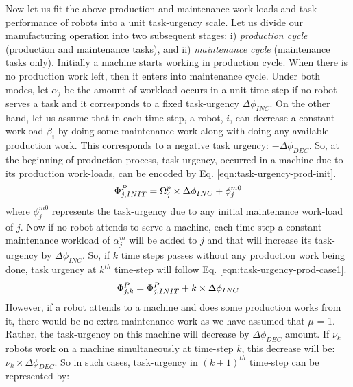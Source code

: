 \documentclass[journal]{IEEEtran}
\begin{document}
Now let us fit the above production and maintenance work-loads and task performance of robots into a unit task-urgency scale. Let us divide our manufacturing operation into two subsequent stages: i) \textit{production cycle} (production and maintenance tasks), and ii) \textit{maintenance cycle} (maintenance tasks only). Initially a machine starts working in production cycle. When there is no production work left, then it enters into maintenance cycle. Under both modes, let $\alpha_{j}$ be the amount of workload occurs in a unit time-step if no robot serves a task and it corresponds to a fixed task-urgency $\Delta \phi_{INC}$. On the other hand, let us assume that in each time-step, a robot, $i$, can decrease a constant workload $\beta_{i}$ by doing some maintenance work along with doing any available production work. This corresponds to a negative task urgency: $- \Delta \phi_{DEC}$. So, at the beginning of production process, task-urgency, occurred in a machine due to its production work-loads, can be encoded by Eq. \ref{eqn:task-urgency-prod-init}.
\begin{equation}
\begin{small}
\Phi_{j, INIT}^{P} = \Omega_{j}^{p} \times \Delta \phi_{INC} + \phi_{j}^{m0}
\label{eqn:task-urgency-prod-init}
\end{small}
\end{equation}
where $\phi_{j}^{m0}$ represents the task-urgency due to any initial maintenance work-load of $j$.
Now if no robot attends to serve a machine, each time-step a constant maintenance workload of $\alpha_{j}^{m}$ will be added to $j$ and that will increase its task-urgency by $\Delta \phi_{INC}$. So, if $k$ time steps passes without any production work being done, task urgency at $k^{th}$ time-step will follow Eq. \ref{eqn:task-urgency-prod-case1}.
\begin{equation}
\begin{small}
\Phi_{j, k}^{P} =\Phi_{j, INIT}^{P} + k \times \Delta \phi_{INC}
\label{eqn:task-urgency-prod-case1}
\end{small}
\end{equation}
However, if a robot attends to a machine and does some production works from it, there would be no extra maintenance work as we have assumed that $\mu$ = 1. Rather, the task-urgency on this machine will decrease by $\Delta \phi_{DEC}$ amount. If $\nu_{k}$ robots work on a machine simultaneously at time-step $k$, this decrease will be: $\nu_{k} \times \Delta \phi_{DEC}$. So in such cases, task-urgency in $(k+1)^{th}$ time-step can be represented by:
\end{document}

